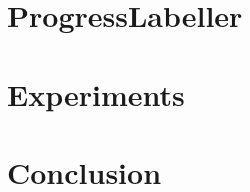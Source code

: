 \documentclass[letterpaper, 10 pt, conference]{ieeeconf}
\begin{document}
\section{ProgressLabeller}



\section{Experiments}


\section{Conclusion}


\balance






\end{document}
